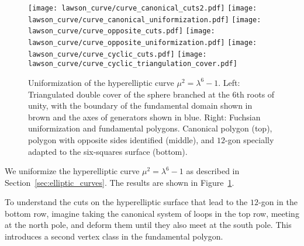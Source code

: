 \documentclass[Thesis]{subfiles}
\begin{document}

\begin{figure}
	\centering
	\resizebox{!}{6.3cm} {
	\texttt{[image: lawson\_curve/curve\_canonical\_cuts2.pdf]}
	\texttt{[image: lawson\_curve/curve\_canonical\_uniformization.pdf]}
	}
	\resizebox{!}{6.3cm} {
	\texttt{[image: lawson\_curve/curve\_opposite\_cuts.pdf]}
	\texttt{[image: lawson\_curve/curve\_opposite\_uniformization.pdf]}
	}
	\resizebox{!}{6.3cm} {
	\texttt{[image: lawson\_curve/curve\_cyclic\_cuts.pdf]}
	\texttt{[image: lawson\_curve/curve\_cyclic\_triangulation\_cover.pdf]}
	}
	\caption{Uniformization of the hyperelliptic curve
          $\mu^2=\lambda^6-1$. Left: Triangulated double cover of the
          sphere branched at the 6th roots of unity, with the boundary
          of the fundamental domain shown in brown and the axes of
          generators shown in blue. Right: Fuchsian uniformization and
          fundamental polygons. Canonical polygon (top), polygon with
          opposite sides identified (middle), and $12$-gon specially
          adapted to the six-squares surface (bottom).}
	\label{fig:lawson_curve}
\end{figure}

We uniformize the hyperelliptic curve $\mu^2=\lambda^6-1$ as described
in Section~\ref{sec:elliptic_curves}. The results are shown in Figure~\ref{fig:lawson_curve}.

To understand the cuts on the hyperelliptic surface that lead to the
$12$-gon in the bottom row, imagine taking the canonical system of
loops in the top row, meeting at the north pole,  and deform them
until they also meet at the south pole. This introduces a second
vertex class in the fundamental polygon.

\end{document}
